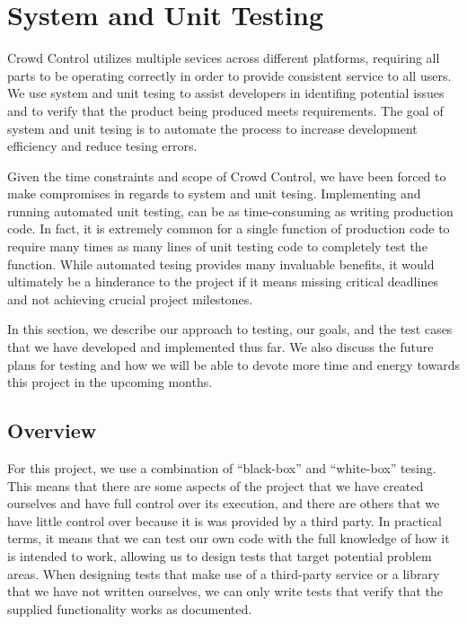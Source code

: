 

\chapter{System and Unit Testing}

Crowd Control utilizes multiple sevices across different platforms, requiring
all parts to be operating correctly in order to provide consistent service to
all users. We use system and unit tesing to assist developers in identifing 
potential issues and to verify that the product being produced meets
requirements. The goal of system and unit tesing is to automate the process to
increase development efficiency and reduce tesing errors.

Given the time constraints and scope of Crowd Control, we have been forced to
make compromises in regards to system and unit tesing. Implementing and running
automated unit testing, can be as time-consuming as writing production code. In
fact, it is extremely common for a single function of production code to require
many times as many lines of unit testing code to completely test the function.
While automated tesing provides many invaluable benefits, it would ultimately be
a hinderance to the project if it means missing critical deadlines and not
achieving crucial project milestones.

In this section, we describe our approach to testing, our goals, and the test
cases that we have developed and implemented thus far. We also discuss the
future plans for testing and how we will be able to devote more time and energy
towards this project in the upcoming months.


\section{Overview}

For this project, we use a combination of ``black-box'' and ``white-box''
tesing. This means that there are some aspects of the project that we have
created ourselves and have full control over its execution, and there are others
that we have little control over because it is was provided by a third party.
In practical terms, it means that we can test our own code with the full
knowledge of how it is intended to work, allowing us to design tests that target
potential problem areas. When designing tests that make use of a third-party
service or a library that we have not written ourselves, we can only write tests
that verify that the supplied functionality works as documented.

